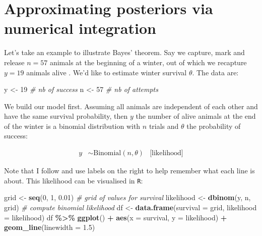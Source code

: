 \documentclass[
  12pt,
]{krantz}
\newenvironment{Shaded}{\begin{snugshade}}{\end{snugshade}}
\newcommand{\AttributeTok}[1]{\textcolor[rgb]{0.13,0.29,0.53}{#1}}
\newcommand{\CommentTok}[1]{\textcolor[rgb]{0.56,0.35,0.01}{\textit{#1}}}
\newcommand{\DecValTok}[1]{\textcolor[rgb]{0.00,0.00,0.81}{#1}}
\newcommand{\FloatTok}[1]{\textcolor[rgb]{0.00,0.00,0.81}{#1}}
\newcommand{\FunctionTok}[1]{\textcolor[rgb]{0.13,0.29,0.53}{\textbf{#1}}}
\newcommand{\NormalTok}[1]{#1}
\newcommand{\OtherTok}[1]{\textcolor[rgb]{0.56,0.35,0.01}{#1}}
\newcommand{\SpecialCharTok}[1]{\textcolor[rgb]{0.81,0.36,0.00}{\textbf{#1}}}
\begin{document}
\section{Approximating posteriors via numerical integration}\label{numerical-approx}

Let's take an example to illustrate Bayes' theorem. Say we capture, mark and release \(n = 57\) animals at the beginning of a winter, out of which we recapture \(y = 19\) animals alive \citep[we used a similar example in][]{king_bayesian_2009}. We'd like to estimate winter survival \(\theta\). The data are:

\begin{Shaded}
\begin{Highlighting}[]
\NormalTok{y }\OtherTok{\textless{}{-}} \DecValTok{19} \CommentTok{\# nb of success}
\NormalTok{n }\OtherTok{\textless{}{-}} \DecValTok{57} \CommentTok{\# nb of attempts}
\end{Highlighting}
\end{Shaded}

We build our model first. Assuming all animals are independent of each other and have the same survival probability, then \(y\) the number of alive animals at the end of the winter is a binomial distribution with \(n\) trials and \(\theta\) the probability of success:

\begin{align*}
y &\sim \text{Binomial}(n, \theta) &\text{[likelihood]}
\end{align*}

Note that I follow \citet{mcelreathbook} and use labels on the right to help remember what each line is about. This likelihood can be visualised in \texttt{R}:

\begin{Shaded}
\begin{Highlighting}[]
\NormalTok{grid }\OtherTok{\textless{}{-}} \FunctionTok{seq}\NormalTok{(}\DecValTok{0}\NormalTok{, }\DecValTok{1}\NormalTok{, }\FloatTok{0.01}\NormalTok{) }\CommentTok{\# grid of values for survival}
\NormalTok{likelihood }\OtherTok{\textless{}{-}} \FunctionTok{dbinom}\NormalTok{(y, n, grid) }\CommentTok{\# compute binomial likelihood}
\NormalTok{df }\OtherTok{\textless{}{-}} \FunctionTok{data.frame}\NormalTok{(}\AttributeTok{survival =}\NormalTok{ grid, }\AttributeTok{likelihood =}\NormalTok{ likelihood) }
\NormalTok{df }\SpecialCharTok{\%\textgreater{}\%}
  \FunctionTok{ggplot}\NormalTok{() }\SpecialCharTok{+} 
  \FunctionTok{aes}\NormalTok{(}\AttributeTok{x =}\NormalTok{ survival, }\AttributeTok{y =}\NormalTok{ likelihood) }\SpecialCharTok{+} 
  \FunctionTok{geom\_line}\NormalTok{(}\AttributeTok{linewidth =} \FloatTok{1.5}\NormalTok{)}
\end{Highlighting}
\end{Shaded}
\end{document}
